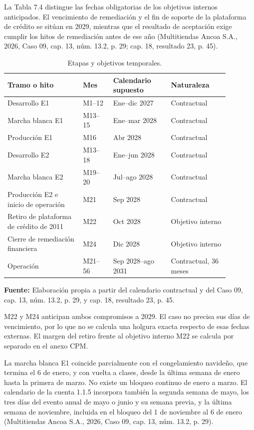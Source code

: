 \documentclass[11pt]{article}
\begin{document}
La Tabla 7.4 distingue las fechas obligatorias de los objetivos internos anticipados. El vencimiento de remediación y el fin de soporte de la plataforma de crédito se sitúan en 2029, mientras que el resultado de aceptación exige cumplir los hitos de remediación antes de ese año (Multitiendas Ancoa S.A., 2026, Caso 09, cap. 13, núm. 13.2, p. 29; cap. 18, resultado 23, p. 45).

\begin{longtable}{p{0.30\linewidth}p{0.12\linewidth}p{0.23\linewidth}p{0.23\linewidth}}
\caption{Etapas y objetivos temporales.}\label{tab:7-4}\\
\toprule\noalign{}
\textbf{Tramo o hito} & \textbf{Mes} & \textbf{Calendario supuesto} & \textbf{Naturaleza} \\
\midrule
\endhead
\bottomrule
\endlastfoot
Desarrollo E1 & M1--12 & Ene--dic 2027 & Contractual \\
Marcha blanca E1 & M13--15 & Ene--mar 2028 & Contractual \\
Producción E1 & M16 & Abr 2028 & Contractual \\
Desarrollo E2 & M13--18 & Ene--jun 2028 & Contractual \\
Marcha blanca E2 & M19--20 & Jul--ago 2028 & Contractual \\
Producción E2 e inicio de operación & M21 & Sep 2028 & Contractual \\
Retiro de plataforma de crédito de 2011 & M22 & Oct 2028 & Objetivo interno \\
Cierre de remediación financiera & M24 & Dic 2028 & Objetivo interno \\
Operación & M21--56 & Sep 2028--ago 2031 & Contractual, 36 meses \\
\end{longtable}
\textbf{Fuente:} Elaboración propia a partir del calendario contractual y del Caso 09, cap. 13, núm. 13.2, p. 29, y cap. 18, resultado 23, p. 45.

M22 y M24 anticipan ambos compromisos a 2029. El caso no precisa sus días de vencimiento, por lo que no se calcula una holgura exacta respecto de esas fechas externas. El margen del retiro frente al objetivo interno M22 se calcula por separado en el anexo CPM.

La marcha blanca E1 coincide parcialmente con el congelamiento navideño, que termina el 6 de enero, y con vuelta a clases, desde la última semana de enero hasta la primera de marzo. No existe un bloqueo continuo de enero a marzo. El calendario de la cuenta 1.1.5 incorpora también la segunda semana de mayo, los tres días del evento anual de mayo o junio y su semana previa, y la última semana de noviembre, incluida en el bloqueo del 1 de noviembre al 6 de enero (Multitiendas Ancoa S.A., 2026, Caso 09, cap. 13, núm. 13.2, p. 29).
\end{document}
